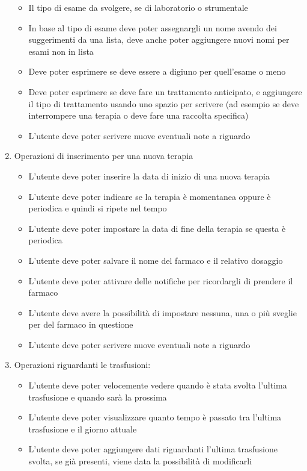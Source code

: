 \documentclass[12pt,a4paper,openright,twoside]{report}
\begin{document}
\begin{enumerate}
\begin{itemize}
        \item Il tipo di esame da svolgere, se di laboratorio o strumentale
        \item In base al tipo di esame deve poter assegnargli un nome avendo dei suggerimenti da una lista, deve anche poter aggiungere nuovi nomi per esami non in lista
        \item Deve poter esprimere se deve essere a digiuno per quell'esame o meno
        \item Deve poter esprimere se deve fare un trattamento anticipato, e aggiungere il tipo di trattamento usando uno spazio per scrivere (ad esempio se deve interrompere una terapia o deve fare una raccolta specifica)
        \item L'utente deve poter scrivere nuove eventuali note a riguardo
    \end{itemize}
    \item Operazioni di inserimento per una nuova terapia
    \begin{itemize}
        \item L'utente deve poter inserire la data di inizio di una nuova terapia
        \item L'utente deve poter indicare se la terapia è momentanea oppure è periodica e quindi si ripete nel tempo
        \item L'utente deve poter impostare la data di fine della terapia se questa è periodica
        \item L'utente deve poter salvare il nome del farmaco e il relativo dosaggio
        \item L'utente deve poter attivare delle notifiche per ricordargli di prendere il farmaco
        \item L'utente deve avere la possibilità di impostare nessuna, una o più sveglie per del farmaco in questione
        \item L'utente deve poter scrivere nuove eventuali note a riguardo
    \end{itemize}
    \item Operazioni riguardanti le trasfusioni:
    \begin{itemize}
        \item L'utente deve poter velocemente vedere quando è stata svolta l'ultima trasfusione e quando sarà la prossima
        \item L'utente deve poter visualizzare quanto tempo è passato tra l'ultima trasfusione e il giorno attuale
        \item L'utente deve poter aggiungere dati riguardanti l'ultima trasfusione svolta, se già presenti, viene data la possibilità di modificarli

\end{itemize}
\end{enumerate}
\end{document}
